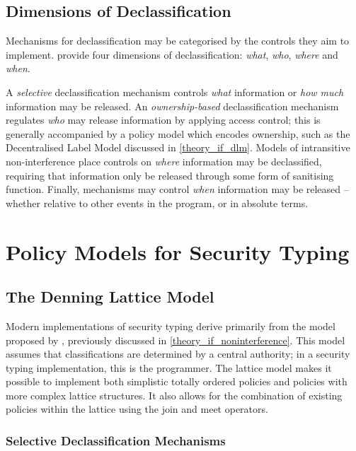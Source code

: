 \subsection{Dimensions of Declassification}

Mechanisms for declassification may be categorised by the controls they aim to implement. \citeauthor{sabelfeld2005dimensions} \cite{sabelfeld2005dimensions} provide four dimensions of declassification: \textit{what}, \textit{who}, \textit{where} and \textit{when}.

A \textit{selective} declassification mechanism controls \textit{what} information or \textit{how much} information may be released. An \textit{ownership-based} declassification mechanism regulates \textit{who} may release information by applying access control; this is generally accompanied by a policy model which encodes ownership, such as the Decentralised Label Model discussed in \ref{theory_if_dlm}. Models of intransitive non-interference \cite{roscoe1999intransitive} place controls on \textit{where} information may be declassified, requiring that information only be released through some form of sanitising function. Finally, mechanisms may control \textit{when} information may be released -- whether relative to other events in the program, or in absolute terms.

\section{Policy Models for Security Typing}

\subsection{The Denning Lattice Model}

Modern implementations of security typing derive primarily from the model proposed by \citeauthor{denning1977certification} \cite{denning1977certification}, previously discussed in \ref{theory_if_noninterference}. This model assumes that classifications are determined by a central authority; in a security typing implementation, this is the programmer. The lattice model makes it possible to implement both simplistic totally ordered policies and policies with more complex lattice structures. It also allows for the combination of existing policies within the lattice using the join and meet operators.

\subsubsection{Selective Declassification Mechanisms}

